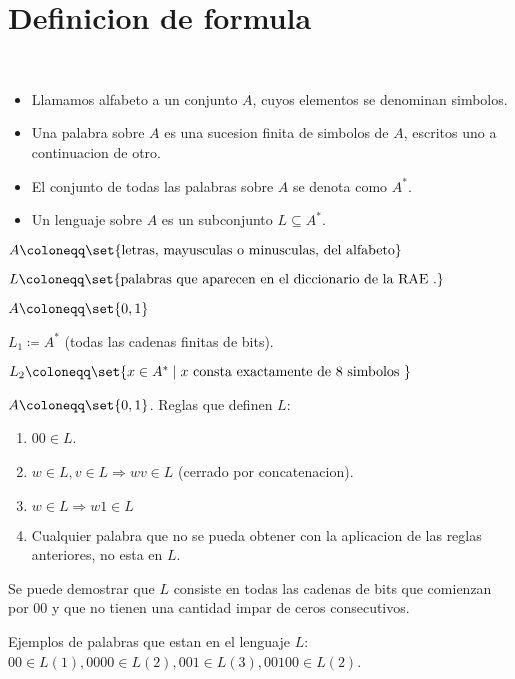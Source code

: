 \section{Definicion de formula}
\begin{definition}
	~\begin{itemize}
		\item Llamamos alfabeto a un conjunto \(A \), cuyos elementos se denominan simbolos.
		\item Una palabra sobre \(A \) es una sucesion finita de simbolos de \(A \), escritos uno a continuacion de otro.
		\item El conjunto de todas las palabras sobre \(A \) se denota como \(A^* \).
		\item Un lenguaje sobre \(A \) es un subconjunto \(L \subseteq A^* \).
	\end{itemize}
\end{definition}

\begin{example}
	\(A \coloneqq \set{\text{letras, mayusculas o minusculas, del alfabeto} }\)

	\(L \coloneqq \set{\text{palabras que aparecen en el diccionario de la RAE } .}\)

	\(A \coloneqq \set{0,1 }\)

	\(L_1 \coloneqq A^* \) (todas las cadenas finitas de bits).

	\(L_2 \coloneqq \set{x \in A^* \mid x \text{ consta exactamente de 8 simbolos } }\)
\end{example}

\begin{example}
	\(A \coloneqq \set{0,1 }\). Reglas que definen \(L \):
	\begin{enumerate}
		\item \(00 \in L \).
		\item \(w \in L, v \in L \Rightarrow wv \in L \) (cerrado por concatenacion).
		\item \(w \in L \Rightarrow w1 \in L \)
		\item Cualquier palabra que no se pueda obtener con la aplicacion de las reglas anteriores, no esta en \(L \).
	\end{enumerate}
	Se puede demostrar que \(L \) consiste en todas las cadenas de bits que comienzan por \(00 \) y que no tienen una cantidad impar de ceros consecutivos.

	Ejemplos de palabras que estan en el lenguaje \(L \): \(00 \in L (1), 0000 \in L (2), 001 \in L (3), 00100 \in L (2)\).
\end{example}

